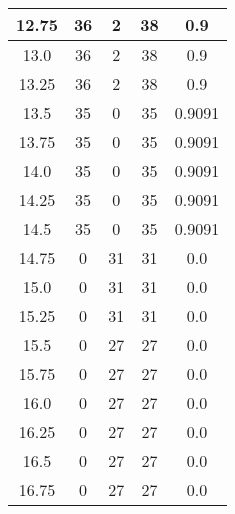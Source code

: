 \documentclass[letterpaper, 12pt]{article}
\begin{document}
\begin{longtable}{|c|c|c|c|c|}
\hline
12.75 & 36 & 2 & 38 & 0.9 \\
\hline
13.0 & 36 & 2 & 38 & 0.9 \\
\hline
13.25 & 36 & 2 & 38 & 0.9 \\
\hline
13.5 & 35 & 0 & 35 & 0.9091 \\
\hline
13.75 & 35 & 0 & 35 & 0.9091 \\
\hline
14.0 & 35 & 0 & 35 & 0.9091 \\
\hline
14.25 & 35 & 0 & 35 & 0.9091 \\
\hline
14.5 & 35 & 0 & 35 & 0.9091 \\
\hline
14.75 & 0 & 31 & 31 & 0.0 \\
\hline
15.0 & 0 & 31 & 31 & 0.0 \\
\hline
15.25 & 0 & 31 & 31 & 0.0 \\
\hline
15.5 & 0 & 27 & 27 & 0.0 \\
\hline
15.75 & 0 & 27 & 27 & 0.0 \\
\hline
16.0 & 0 & 27 & 27 & 0.0 \\
\hline
16.25 & 0 & 27 & 27 & 0.0 \\
\hline
16.5 & 0 & 27 & 27 & 0.0 \\
\hline
16.75 & 0 & 27 & 27 & 0.0 \\
\hline
\end{longtable}
\end{document}
